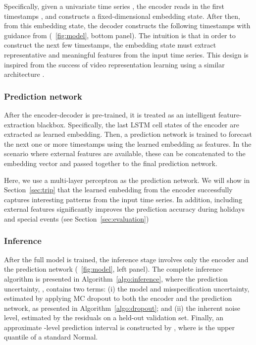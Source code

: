 \documentclass[conference,compsoc,final]{IEEEtran}
\begin{document}
Specifically, given a univariate time series , the encoder reads in the first  timestamps , and constructs a fixed-dimensional embedding state. After then, from this embedding state, the decoder constructs the following  timestamps  with guidance from  (\figurename~\ref{fig:model}, bottom panel).
The intuition is that in order to construct the next few timestamps, the embedding state must extract representative and meaningful features from the input time series.
This design is inspired from the success of video representation learning using a similar architecture \cite{srivastava2015unsupervised}.

\subsubsection{Prediction network}
After the encoder-decoder is pre-trained, it is treated as an intelligent feature-extraction blackbox. Specifically, the last LSTM cell states of the encoder are extracted as learned embedding. Then, a prediction network is trained to forecast  the next one or more timestamps using the learned embedding as features. In the scenario where external features are available, these can be concatenated to the embedding vector and passed together to the final prediction network.

Here, we use a multi-layer perceptron as the prediction network. We will show in Section~\ref{sec:trip} that the learned embedding from the encoder successfully captures interesting patterns from the input time series. In addition, including external features significantly improves the prediction accuracy during holidays and special events (see Section~\ref{sec:evaluation})


\subsubsection{Inference}

After the full model is trained, the inference stage involves only the encoder and the prediction network (\figurename~\ref{fig:model}, left panel). The complete inference algorithm is presented in Algorithm~\ref{algo:inference}, where the prediction uncertainty, , contains two terms: (i) the model and misspecification uncertainty, estimated by applying MC dropout to both the encoder and the prediction network, as presented in Algorithm~\ref{algo:dropout}; and (ii) the inherent noise level, estimated by the residuals on a held-out validation set. Finally, an approximate -level prediction interval is constructed by , where  is the upper  quantile of a standard Normal.
\end{document}
